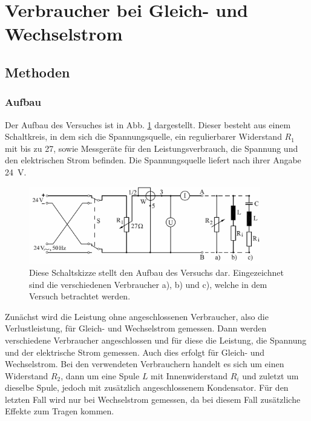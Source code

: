 \section{Verbraucher bei Gleich- und Wechselstrom} 



\subsection{Methoden}

\subsubsection{Aufbau}

Der Aufbau des Versuches ist in Abb. \ref{fig:Schaltskizze} dargestellt. %
Dieser besteht aus einem Schaltkreis, in dem sich die Spannungsquelle, ein regulierbarer Widerstand  $R_1$ mit bis zu \SI{27}{\Omega}, sowie Messgeräte für den Leistungsverbrauch, die Spannung und den elektrischen Strom befinden. 
Die Spannungsquelle liefert nach ihrer Angabe \SI{24}{\V}.
\begin{figure}[ht]
	\centering
	\includegraphics[width=0.9\textwidth]{auswertung/Schaltung2.png}
	\caption{Diese Schaltskizze stellt den Aufbau des Versuchs dar. Eingezeichnet sind die verschiedenen Verbraucher a), b) und c), welche in dem Versuch betrachtet werden.}
	\label{fig:Schaltskizze}	
\end{figure}
Zunächst wird die Leistung ohne angeschlossenen Verbraucher, also die Verlustleistung, für Gleich- und Wechselstrom gemessen. 
Dann werden verschiedene Verbraucher angeschlossen und für diese die Leistung, die Spannung und der elektrische Strom gemessen.
Auch dies erfolgt für Gleich- und Wechselstrom.
Bei den verwendeten Verbrauchern handelt es sich um einen Widerstand $R_2$, dann um eine Spule $L$ mit Innenwiderstand $R_i$ und zuletzt um dieselbe Spule, jedoch mit zusätzlich angeschlossenem Kondensator.
Für den letzten Fall wird nur bei Wechselstrom gemessen, da bei diesem Fall zusätzliche Effekte zum Tragen kommen.

